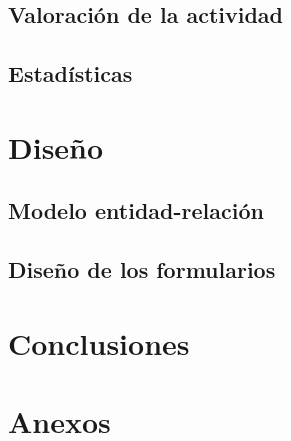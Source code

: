 \documentclass{article}
\begin{document}
\subsection{Valoración de la actividad}

\subsection{Estadísticas}

\section{Diseño}

\subsection{Modelo entidad-relación}

\subsection{Diseño de los formularios}

\section{Conclusiones}




\newpage

\thispagestyle{empty}

\vspace*{0.3\textwidth}

\begin{figure}[h]
  \centering
  
\end{figure}



\newpage

\section{Anexos}
\label{sec:anexos}


\label{doc:ficha-tecnica}

\end{document}
